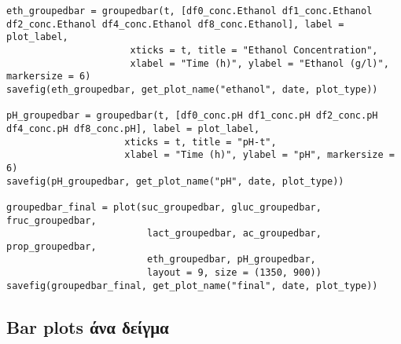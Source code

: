 \documentclass[11pt]{article}
\begin{document}
\begin{verbatim}
eth_groupedbar = groupedbar(t, [df0_conc.Ethanol df1_conc.Ethanol df2_conc.Ethanol df4_conc.Ethanol df8_conc.Ethanol], label = plot_label,
                      xticks = t, title = "Ethanol Concentration",
                      xlabel = "Time (h)", ylabel = "Ethanol (g/l)", markersize = 6)
savefig(eth_groupedbar, get_plot_name("ethanol", date, plot_type))

pH_groupedbar = groupedbar(t, [df0_conc.pH df1_conc.pH df2_conc.pH df4_conc.pH df8_conc.pH], label = plot_label,
                     xticks = t, title = "pH-t",
                     xlabel = "Time (h)", ylabel = "pH", markersize = 6)
savefig(pH_groupedbar, get_plot_name("pH", date, plot_type))

groupedbar_final = plot(suc_groupedbar, gluc_groupedbar, fruc_groupedbar,
                         lact_groupedbar, ac_groupedbar, prop_groupedbar,
                         eth_groupedbar, pH_groupedbar,
                         layout = 9, size = (1350, 900))
savefig(groupedbar_final, get_plot_name("final", date, plot_type))

\end{verbatim}

\subsection{Bar plots άνα δείγμα}
\label{sec:orga851530}
\end{document}
